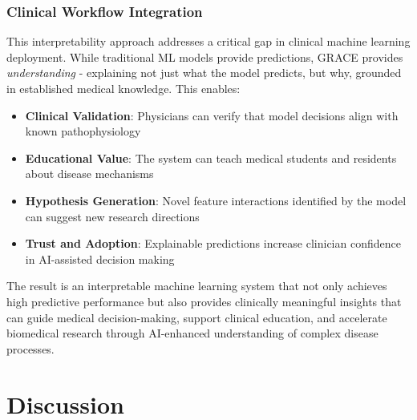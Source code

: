 \documentclass{article}
\begin{document}
\subsubsection{Clinical Workflow Integration}

This interpretability approach addresses a critical gap in clinical machine learning deployment. While traditional ML models provide predictions, GRACE provides \textit{understanding} - explaining not just what the model predicts, but why, grounded in established medical knowledge. This enables:

\begin{itemize}
    \item \textbf{Clinical Validation}: Physicians can verify that model decisions align with known pathophysiology
    \item \textbf{Educational Value}: The system can teach medical students and residents about disease mechanisms
    \item \textbf{Hypothesis Generation}: Novel feature interactions identified by the model can suggest new research directions
    \item \textbf{Trust and Adoption}: Explainable predictions increase clinician confidence in AI-assisted decision making
\end{itemize}

The result is an interpretable machine learning system that not only achieves high predictive performance but also provides clinically meaningful insights that can guide medical decision-making, support clinical education, and accelerate biomedical research through AI-enhanced understanding of complex disease processes.

\section{Discussion}




\end{document}
